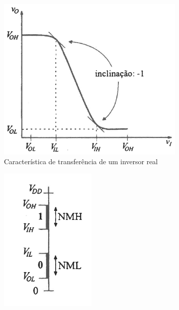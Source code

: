 \vspace{-0.75em}
\begin{figure}[H]
    \centering
    \begin{subfigure}[b]{0.55\linewidth}
        \centering
        \includegraphics[width = \linewidth]{img/5/inv-transfer-function.png}
        \caption{Característica de transferência de um inversor real \cite{medeiros:CTBM}}
        \label{fig:inv-transfer-function}
    \end{subfigure}%
    \begin{subfigure}[b]{0.3\linewidth}
        \centering
        \includegraphics[width = 0.85\linewidth]{img/5/noise-margins.png}

\end{subfigure}
\end{figure}
